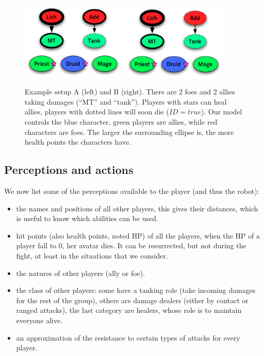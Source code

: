 \begin{figure}[h!]
\begin{center}
\includegraphics[width=5cm]{images/wow_fight1.png} \hspace{1.5cm} \includegraphics[width=5cm]{images/wow_fight2.png}
\caption{Example setup A (left) and B (right). There are 2 foes and 2 allies taking damages (``MT'' and ``tank''). Players with stars can heal allies, players with dotted lines will soon die ($ID=true$). Our model controls the blue character, green players are allies, while red characters are foes. The larger the surrounding ellipse is, the more health points the characters have.}
\label{fig:wow_fight}
\end{center}
\end{figure}

\subsection{Perceptions and actions}
We now list some of the perceptions available to the player (and thus the robot):
\begin{itemize}
    \item the names and positions of all other players, this gives their distances, which is useful to know which abilities can be used.
    \item hit points (also health points, noted HP) of all the players, when the HP of a player fall to 0, her avatar dies. It can be resurrected, but not during the fight, at least in the situations that we consider.
    \item the natures of other players (ally or foe).
    \item the class of other players: some have a tanking role (take incoming damages for the rest of the group), others are damage dealers (either by contact or ranged attacks), the last category are healers, whose role is to maintain everyone alive.
    \item an approximation of the resistance to certain types of attacks for every player.
\end{itemize}

